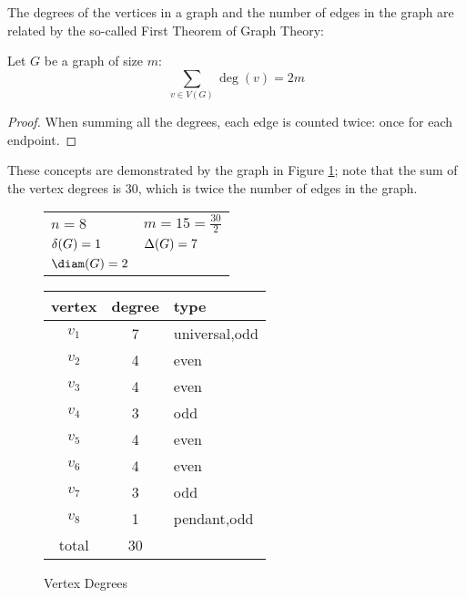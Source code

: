 The degrees of the vertices in a graph and the number of edges in the graph are related by the so-called First
Theorem of Graph Theory:

\begin{theorem}
  \label{thm:first}
  Let \(G\) be a graph of size \(m\):
  \[\sum_{v\in V(G)}\deg(v)=2m\]
\end{theorem}

\begin{proof}
  When summing all the degrees, each edge is counted twice: once for each endpoint.
\end{proof}

These concepts are demonstrated by the graph in Figure \ref{fig:degree}; note that the sum of the vertex degrees is
30, which is twice the number of edges in the graph.

\begin{figure}[h]
  \label{fig:degree}
  \begin{minipage}[t]{3in}
    \begin{center}
      \vspace{0pt}

      \bigskip

      \begin{tabular}{ll}
        \(n=8\) & \(m=15=\frac{30}{2}\) \\
        \(\delta(G)=1\) & \(\Delta(G)=7\) \\
        \(\diam(G)=2\)
      \end{tabular}
    \end{center}
  \end{minipage}
  \begin{minipage}[t]{3in}
    \vspace{0pt}
    \begin{tabular}{c|c|l}
      vertex & degree & type \\
      \hline
      \(v_1\) & 7 & universal,odd \\
      \(v_2\) & 4 & even \\
      \(v_3\) & 4 & even \\
      \(v_4\) & 3 & odd \\
      \(v_5\) & 4 & even \\
      \(v_6\) & 4 & even \\
      \(v_7\) & 3 & odd \\
      \(v_8\) & 1 & pendant,odd \\
      \hline
      total & 30 &
    \end{tabular}
  \end{minipage}
  \caption{Vertex Degrees}
\end{figure}


